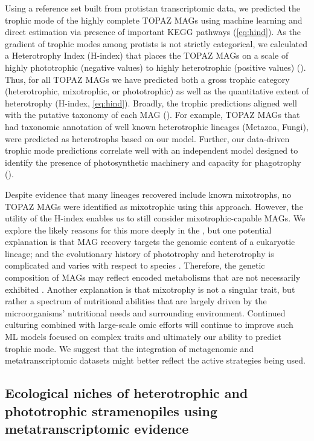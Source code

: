 \documentclass[12pt]{article}
\numberwithin{equation}{section}
\begin{document}
Using a reference set built from protistan transcriptomic data, we predicted the trophic mode of the highly complete TOPAZ MAGs using machine learning and direct estimation via presence of important KEGG pathways (\cref{eq:hind}). As the gradient of trophic modes among protists is not strictly categorical, we calculated a Heterotrophy Index (H-index) that places the TOPAZ MAGs on a scale of highly phototrophic (negative values) to highly heterotrophic (positive values) (). Thus, for all TOPAZ MAGs we have predicted both a gross trophic category (heterotrophic, mixotrophic, or phototrophic) as well as the quantitative extent of heterotrophy (H-index, \cref{eq:hind}). Broadly, the trophic predictions aligned well with the putative taxonomy of each MAG (). For example, TOPAZ MAGs that had taxonomic annotation of well known heterotrophic lineages (Metazoa, Fungi),  were predicted as heterotrophs based on our model.  Further, our data-driven trophic mode predictions correlate well with an independent model designed to identify the presence of photosynthetic machinery and capacity for phagotrophy \citep{burns2018gene} (). 



Despite evidence that many lineages recovered include known mixotrophs, no TOPAZ MAGs were identified as mixotrophic using this approach. However, the utility of the H-index enables us to still consider mixotrophic-capable MAGs. We explore the likely reasons for this more deeply in the , but one potential explanation is that MAG recovery targets the genomic content of a eukaryotic lineage; and the evolutionary history of phototrophy and heterotrophy is complicated and varies with respect to species \citep{Flynn_2019}. Therefore, the genetic composition of MAGs may reflect encoded metabolisms that are not necessarily exhibited . Another explanation is that mixotrophy is not a singular trait, but rather a spectrum of nutritional abilities that are largely driven by the microorganisms' nutritional needs and surrounding environment. Continued culturing combined with large-scale omic efforts will continue to improve such ML models focused on complex traits and ultimately our ability to predict trophic mode. We suggest that the integration of metagenomic and metatranscriptomic datasets might better reflect the active strategies being used. 


\subsection*{Ecological niches of heterotrophic and phototrophic stramenopiles using metatranscriptomic evidence}
\end{document}
